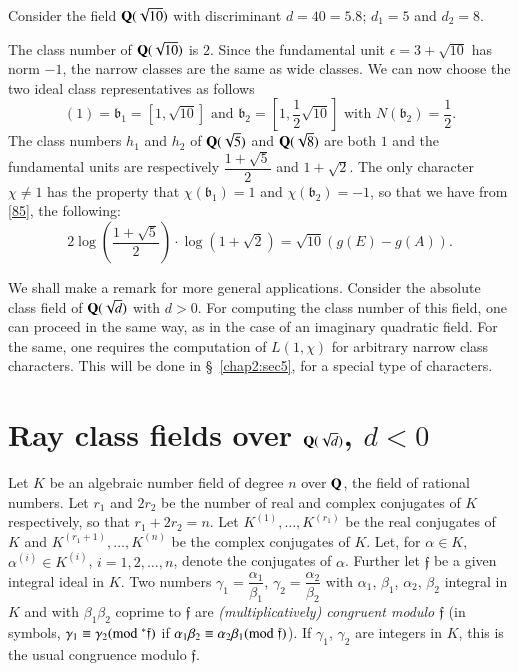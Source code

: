 \begin{example*}
Consider the field $\mathbf{Q}(\sqrt{10})$ with discriminant $d=40=5.8$;
$d_{1}=5$ and $d_{2}=8$.

The class number of $\mathbf{Q}(\sqrt{10})$ is $2$. Since the fundamental
unit $\epsilon=3+\sqrt{10}$ has norm $-1$, the narrow classes are the
same as wide classes. We can now choose the two ideal class
representatives as follows
$$
(1)=\mathfrak{b}_{1}=[1,\sqrt{10}]\text{ \ and \ }
\mathfrak{b}_{2}=\left[1,\frac{1}{2}\sqrt{10}\right]\text{ \ with \ }
N(\mathfrak{b}_{2})=\frac{1}{2}. 
$$
The class numbers $h_{1}$ and $h_{2}$ of $\mathbf{Q}(\sqrt{5})$ and
$\mathbf{Q}(\sqrt{8})$ are both $1$ and the fundamental units are
respectively $\dfrac{1+\sqrt{5}}{2}$ and $1+\sqrt{2}$. The only
character $\chi\neq 1$ has the property that
$\chi(\mathfrak{b}_{1})=1$ and $\chi(\mathfrak{b}_{2})=-1$, so that we
have from \eqref{85}, the following:
$$
2\log\left(\frac{1+\sqrt{5}}{2}\right)\cdot\log
(1+\sqrt{2})=\sqrt{10}(g(E)-g(A)). 
$$
\end{example*}

We shall make a remark for more general applications. Consider the
absolute class field of $\mathbf{Q}(\sqrt{d})$ with $d>0$. For computing the
class number of this field, one can proceed in the same way, as in the
case of an imaginary quadratic field. For the same, one requires the
computation of $L(1,\chi)$ for arbitrary narrow class characters. This
will be done in \S\ \ref{chap2:sec5}, for a special type of
characters.

\section{Ray class fields over $\mathbf{Q}(\sqrt{d})$,
  $d<0$}\label{chap2:sec4} 
\pageoriginale

Let $K$ be an algebraic number field of degree $n$ over $\mathbf{Q}$, the
field of rational numbers. Let $r_{1}$ and $2r_{2}$ be the number of
real and complex conjugates of $K$ respectively, so that
$r_{1}+2r_{2}=n$. Let $K^{(1)},\ldots,K^{(r_{1})}$ be the real
conjugates of $K$ and $K^{(r_{1}+1)},\ldots,K^{(n)}$ be the complex
conjugates of $K$. Let, for $\alpha\in K$, $\alpha^{(i)}\in K^{(i)}$,
$i=1,2,\ldots,n$, denote the conjugates of $\alpha$. Further let
$\mathfrak{f}$ be a given integral ideal in $K$. Two numbers
$\gamma_{1}=\dfrac{\alpha_{1}}{\beta_{1}}$,
$\gamma_{2}=\dfrac{\alpha_{2}}{\beta_{2}}$ with $\alpha_{1}$,
$\beta_{1}$, $\alpha_{2}$, $\beta_{2}$ integral in $K$ and with
$\beta_{1}\beta_{2}$ coprime to $\mathfrak{f}$ are
{\em(multiplicatively) congruent modulo $\mathfrak{f}$} (in symbols,
$\gamma_{1}\equiv \gamma_{2}(\rm{mod} \;^{\ast}\mathfrak{f})$ if
$\alpha_{1}\beta_{2}\equiv \alpha_{2}\beta_{1}(\rm{mod} \;
\mathfrak{f})$). If $\gamma_{1}$, $\gamma_{2}$ are integers in $K$,
this is the usual congruence modulo $\mathfrak{f}$.

